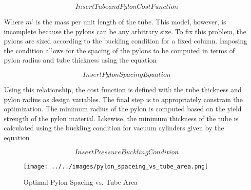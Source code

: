 \begin{equation}
	\label{eq:tube_pylon_cost}
	Insert Tube and Pylon Cost Function
\end{equation}

Where $m’$ is the mass per unit length of the tube. This model, however, is incomplete because the pylons can be any arbitrary size. To fix this problem, the pylons are sized according to the buckling condition for a fixed column. Imposing the condition allows for the spacing of the pylons to be computed in terms of pylon radius and tube thickness using the equation

\begin{equation}
	\label{eq:pylon_spacing}
	Insert Pylon Spacing Equation
\end{equation}

Using this relationship, the cost function is defined with the tube thickness and pylon radius as design variables. The final step is to appropriately constrain the optimization. The minimum radius of the pylon is computed based on the yield strength of the pylon material. Likewise, the minimum thickness of the tube is calculated using the buckling condition for vacuum cylinders given by the equation \cite{thin_walled_buckling}

\begin{equation}
	\label{eq:pres_buckling}
	Insert Pressure Buckling Condition
\end{equation}

\begin{figure}
	\centering
	\texttt{[image: ../../images/pylon\_spaceing\_vs\_tube\_area.png]}
	\caption{Optimal Pylon Spacing vs. Tube Area}
	\label{fig:pylon_spacing_vs_tube_area}
\end{figure}

